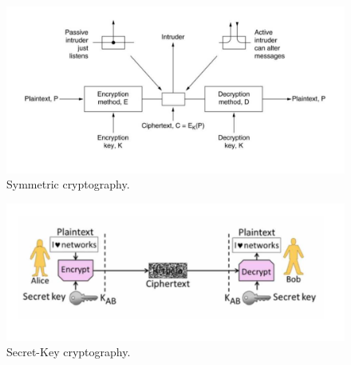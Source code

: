 \documentclass[twoside]{article}
\begin{document}
\begin{figure}
  \includegraphics[width=\linewidth]{sym-crypto.png}
  \caption{Symmetric cryptography.}
  \label{fig:sym-crypto}
\end{figure}
\begin{figure}
  \includegraphics[width=\linewidth]{secret-key.png}
  \caption{Secret-Key cryptography.}
  \label{fig:secret-key}
\end{figure}
\end{document}
